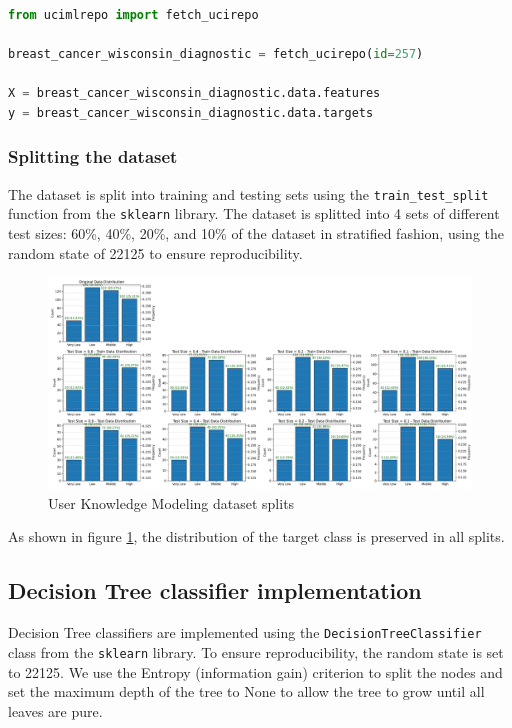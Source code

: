 \lstset{style=code}
\begin{lstlisting}[language=Python]
from ucimlrepo import fetch_ucirepo 

breast_cancer_wisconsin_diagnostic = fetch_ucirepo(id=257) 
    
X = breast_cancer_wisconsin_diagnostic.data.features 
y = breast_cancer_wisconsin_diagnostic.data.targets 
\end{lstlisting}

\subsubsection{Splitting the dataset}

The dataset is split into training and testing sets using the \texttt{train\_test\_split} function from the \texttt{sklearn} library. 
The dataset is splitted into 4 sets of different test sizes: 60\%, 40\%, 20\%, and 10\% of the dataset in stratified fashion, using the random state of 22125 to ensure reproducibility.

\begin{figure}[H]
    \centering
    \includegraphics[width=\textwidth]{figures/user_knowledge_modeling_split.pdf}
    \caption{User Knowledge Modeling dataset splits}
    \label{fig:user_knowledge_modeling_split}
\end{figure}

As shown in figure \ref{fig:user_knowledge_modeling_split}, the distribution of the target class is preserved in all splits.

\subsection{Decision Tree classifier implementation}

Decision Tree classifiers are implemented using the \texttt{DecisionTreeClassifier} class from the \texttt{sklearn} library. 
To ensure reproducibility, the random state is set to 22125. 
We use the Entropy (information gain) criterion to split the nodes and set the maximum depth of the tree to None to allow the tree to grow until all leaves are pure.

